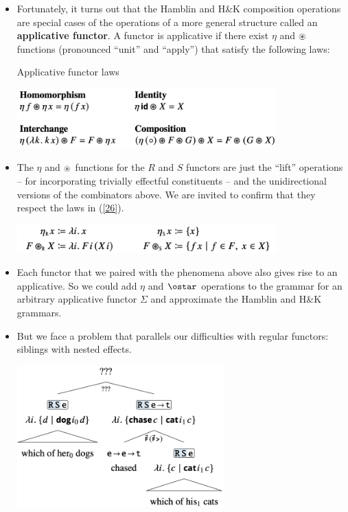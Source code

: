 \documentclass{article}
\begin{document}
\begin{itemize}
  \item Fortunately, it turns out that the Hamblin and H\&K composition operations are special cases of the operations of a more general structure called an
    \textbf{applicative functor}. A functor is applicative if there exist $\eta$ and $\oast$ functions (pronounced ``unit'' and ``apply'')
    that satisfy the following laws:
    \begin{exe}
      \ex \label{26} Applicative functor laws \hfill
        \begin{center}
          \includegraphics[width=10cm]{clips/26.png}
        \end{center}
    \end{exe}
  \item The $\eta$ and $\oast$ functions for the $R$ and $S$ functors are just the ``lift'' operations -- for incorporating trivially effectful
    constituents -- and the unidirectional versions of the combinators above. We are invited to confirm that they respect the laws in (\ref{26}).
    \begin{exe}
      \ex \hfill
        \begin{center}
          \includegraphics[width=10cm]{clips/27.png}
        \end{center}
    \end{exe}
  \item Each functor that we paired with the phenomena above also gives rise to an applicative. So we could add $\eta$ and $\ostar$ operations to the grammar
   for an arbitrary applicative functor $\Sigma$ and approximate the Hamblin and H\&K grammars.
  \item But we face a problem that parallels our difficulties with regular functors: siblings with nested effects.
    \begin{exe}
      \ex \hfill
        \begin{center}
          \includegraphics[width=8cm]{clips/28.png}
        \end{center}
    \end{exe}
  

\end{itemize}
\end{document}
